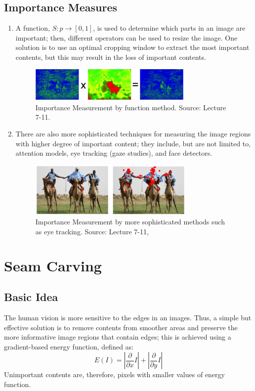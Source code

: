 \documentclass{article}
\begin{document}
\subsection{Importance Measures}
\begin{enumerate}
\item A function, $S: p \rightarrow [0,1]$, is used to determine which parts in an image are important; then, different operators can be used to resize the image. One solution is to use an optimal cropping window to extract the most important contents, but this may result in the loss of important contents.
\begin{figure}[H]
\centering
\includegraphics[width=8cm]{Function.png}
\caption{Importance Measurement by function method. Source: Lecture 7-11.}
\end{figure}
\item There are also more sophisticated techniques for measuring the image regions with higher degree of important content; they include, but are not limited to, attention models, eye tracking (gaze studies), and face detectors.
\begin{figure}[H]
\centering
\includegraphics[width=8cm]{Tracking.png}
\caption{Importance Measurement by more sophisticated methods such as eye tracking. Source: Lecture 7-11, \cite{judd2009learning}}
\end{figure}
\end{enumerate}

\section{Seam Carving}
\subsection{Basic Idea}
The human vision is more sensitive to the edges in an images. Thus, a simple but effective solution is to remove contents from smoother areas and preserve the more informative image regions that contain edges; this is achieved using a gradient-based energy function, defined as:
$$
E(I) = |\frac{\partial}{\partial x}I| + |\frac{\partial}{\partial y}I|
$$
Unimportant contents are, therefore, pixels with smaller values of energy function.
\end{document}
